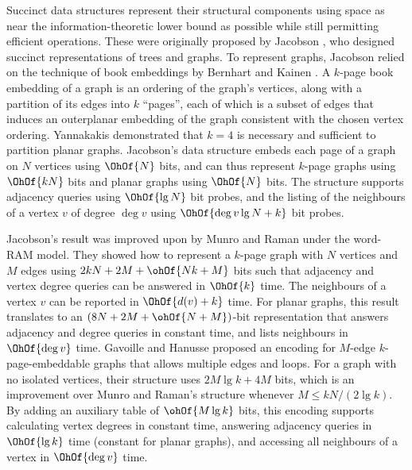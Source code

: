 {Succinct data structures represent their structural
components using space as near the information-theoretic lower bound as
possible while still permitting efficient operations.
These were originally proposed by Jacobson
\cite{jac_1989}, who designed succinct representations of trees and
graphs.
To represent graphs, Jacobson relied on the technique of book
embeddings by Bernhart and Kainen
\cite{DBLP:journals/jct/BernhartK79}.
A $k$-page book embedding of a graph is an ordering of the graph's vertices,
along with a partition of its edges into $k$ ``pages'',
each of which is a subset of edges that induces an outerplanar embedding of
the graph consistent with the chosen vertex ordering.
Yannakakis \cite{DBLP:conf/stoc/Yannakakis86}
demonstrated that $k=4$ is necessary and sufficient to partition
planar graphs.
Jacobson's data structure embeds each page of a graph
on $N$ vertices using $\OhOf{N}$ bits, and can thus represent
$k$-page graphs using $\OhOf{kN}$ bits and planar graphs using
$\OhOf{N}$ bits.
The structure supports adjacency queries using
$\OhOf{\lg N}$ bit probes, and the listing of the neighbours of a
vertex $v$ of degree $\deg{v}$ using $\OhOf{\deg{v} \lg N + k}$ bit
probes.

Jacobson's result was improved upon by Munro and Raman
\cite{DBLP:conf/focs/MunroR97} under the word-RAM model.
They showed how to represent a $k$-page graph with $N$ vertices and $M$ edges
using $2kN + 2M + \ohOf{Nk + M}$ bits such that adjacency and
vertex degree queries can be answered in $\OhOf{k}$ time.
The neighbours of a vertex $v$ can be reported in $\OhOf{d(v)+k}$ time.
For planar graphs, this result translates to an $(8N + 2M + \ohOf{N+M})$-bit
representation that answers adjacency and degree queries in constant
time, and lists neighbours in $\OhOf{\deg{v}}$ time.
Gavoille and Hanusse \cite{DBLP:journals/dmtcs/GavoilleH08} proposed an encoding
for $M$-edge $k$-page-embeddable graphs that allows multiple edges and
loops.
For a graph with no isolated vertices, their structure uses $2M
\lg k + 4M$ bits, which is an improvement over Munro and Raman's
structure whenever $M \le kN / (2\lg k)$.
By adding an auxiliary table of $\ohOf{M \lg k}$ bits, this encoding
supports calculating vertex degrees in constant time, answering adjacency
queries in $\OhOf{\lg k}$ time (constant for planar graphs), and
accessing all neighbours of a vertex in $\OhOf{\deg{v}}$ time.

}
